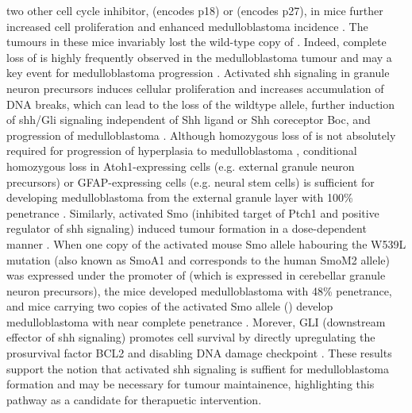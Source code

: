 two other cell cycle inhibitor,  (encodes p18) or  (encodes p27), in  mice further increased cell proliferation and enhanced medulloblastoma incidence . The tumours in these mice invariably lost the wild-type copy of  . Indeed, complete loss of  is highly frequently observed in the medulloblastoma tumour and may a key event for medulloblastoma progression . Activated \gls{shh} signaling in \high{-/+} granule neuron precursors induces cellular proliferation and increases accumulation of DNA breaks, which can lead to the loss of the wildtype  allele, further induction of \gls{shh}/Gli signaling independent of Shh ligand or Shh coreceptor Boc, and progression of medulloblastoma . Although homozygous loss of  is not absolutely required for progression of hyperplasia to medulloblastoma , conditional homozygous loss in Atoh1-expressing cells (e.g. external granule neuron precursors) or GFAP-expressing cells (e.g. neural stem cells) is sufficient for developing medulloblastoma from the external granule layer with 100\% penetrance . Similarly, activated Smo (inhibited target of Ptch1 and positive regulator of \gls{shh} signaling) induced tumour formation in a dose-dependent manner . When one copy of the activated mouse Smo allele habouring the W539L mutation (also known as SmoA1 and corresponds to the human SmoM2 allele) was expressed under the promoter of  (which is expressed in cerebellar granule neuron precursors), the mice developed medulloblastoma with 48\% penetrance, and mice carrying two copies of the activated Smo allele () develop medulloblastoma with near complete penetrance . Morever, GLI (downstream effector of \gls{shh} signaling) promotes cell survival by directly upregulating the prosurvival factor BCL2  and disabling DNA damage checkpoint . These results support the notion that activated \gls{shh} signaling is suffient for medulloblastoma formation and may be necessary for tumour maintainence, highlighting this pathway as a candidate for therapuetic intervention.


